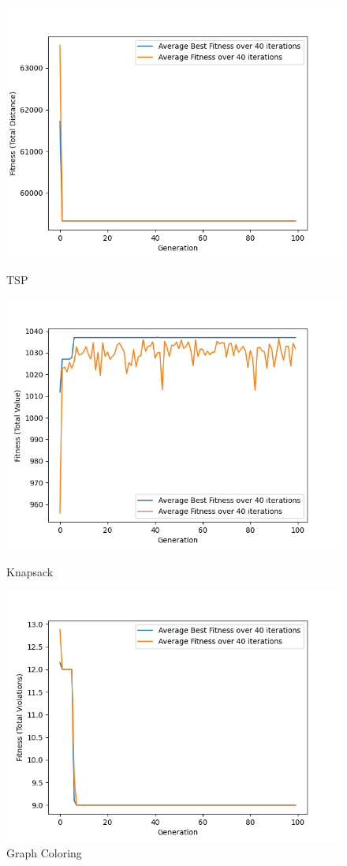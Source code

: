 \documentclass[11pt, letterpaper]{article}
\begin{document}
\begin{figure}[H]
  \includegraphics[width=\linewidth]{images/tsp_tr_tr.png}
  \caption{TSP}
\endminipage\hfill
{}
  \includegraphics[width=\linewidth]{images/knapsack_tr_tr.png}
  \caption{Knapsack}
\endminipage\hfill
{}%
  \includegraphics[width=\linewidth]{images/graphcoloring_tr_tr.png}
  \caption{Graph Coloring}
\endminipage
\end{figure}
\end{document}
